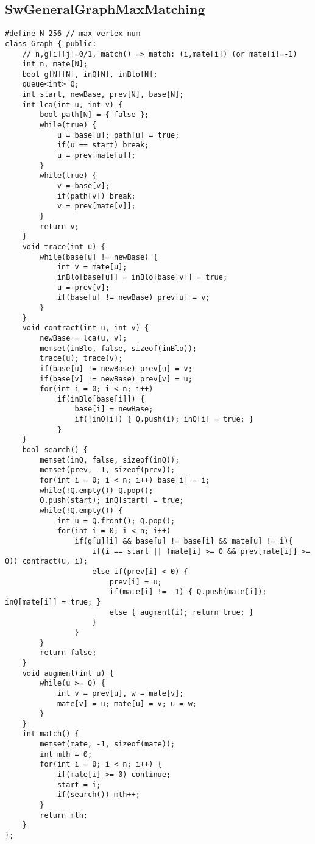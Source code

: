 \documentclass[10pt,twocolumn,oneside]{article}
\begin{document}
\subsection{SwGeneralGraphMaxMatching}
\begin{lstlisting}
#define N 256 // max vertex num
class Graph { public:
	// n,g[i][j]=0/1, match() => match: (i,mate[i]) (or mate[i]=-1)
	int n, mate[N];
	bool g[N][N], inQ[N], inBlo[N];
	queue<int> Q;
	int start, newBase, prev[N], base[N];
	int lca(int u, int v) {
		bool path[N] = { false };
		while(true) {
			u = base[u]; path[u] = true;
			if(u == start) break;
			u = prev[mate[u]];
		}
		while(true) {
			v = base[v];
			if(path[v]) break;
			v = prev[mate[v]];
		}
		return v;
	}
	void trace(int u) {
		while(base[u] != newBase) {
			int v = mate[u];
			inBlo[base[u]] = inBlo[base[v]] = true;
			u = prev[v];
			if(base[u] != newBase) prev[u] = v;
		}
	}
	void contract(int u, int v) {
		newBase = lca(u, v);
		memset(inBlo, false, sizeof(inBlo));
		trace(u); trace(v);
		if(base[u] != newBase) prev[u] = v;
		if(base[v] != newBase) prev[v] = u;
		for(int i = 0; i < n; i++)
			if(inBlo[base[i]]) {
				base[i] = newBase;
				if(!inQ[i]) { Q.push(i); inQ[i] = true; }
			}
	}
	bool search() {
		memset(inQ, false, sizeof(inQ));
		memset(prev, -1, sizeof(prev));
		for(int i = 0; i < n; i++) base[i] = i;
		while(!Q.empty()) Q.pop();
		Q.push(start); inQ[start] = true;
		while(!Q.empty()) {
			int u = Q.front(); Q.pop();
			for(int i = 0; i < n; i++)
				if(g[u][i] && base[u] != base[i] && mate[u] != i){
					if(i == start || (mate[i] >= 0 && prev[mate[i]] >= 0)) contract(u, i);
					else if(prev[i] < 0) {
						prev[i] = u;
						if(mate[i] != -1) { Q.push(mate[i]); inQ[mate[i]] = true; }
						else { augment(i); return true; }
					}
				}
		}
		return false;
	}
	void augment(int u) {
		while(u >= 0) {
			int v = prev[u], w = mate[v];
			mate[v] = u; mate[u] = v; u = w;
		}
	}
	int match() {
		memset(mate, -1, sizeof(mate));
		int mth = 0;
		for(int i = 0; i < n; i++) {
			if(mate[i] >= 0) continue;
			start = i;
			if(search()) mth++;
		}
		return mth;
	}
};
\end{lstlisting}
\end{document}
